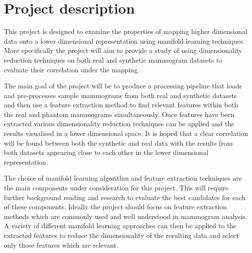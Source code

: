 \documentclass[11pt,fleqn,twoside]{article}
\begin{document}
\wordcount{}

\mmp

\setcounter{tocdepth}{3} %


\section{Project description}
This project is designed to examine the properties of mapping higher dimensional data onto a lower dimensional representation using manifold learning techniques. More specifically the project will aim to provide a study of using dimensionality reduction techniques on both real \cite{suckling1994mammographic} and synthetic\cite{bakic2002mammogram1, bakic2002mammogram2, bakic2003mammogram3} mammogram datasets to evaluate their correlation under the mapping.

The main goal of the project will be to produce a processing pipeline that loads and pre-processes sample mammograms from both real and synthetic datasets and then use a feature extraction method to find relevant features within both the real and phantom mammograms simultaneously. Once features have been extracted various dimensionality reduction techniques can be applied and the results visualised in a lower dimensional space. It is hoped that a clear correlation will be found between both the synthetic and real data with the results from both datasets appearing close to each other in the lower dimensional representation.

The choice of manifold learning algorithm and feature extraction techniques are the main components under consideration for this project. This will require further background reading and research to evaluate the best candidates for each of these components. Ideally the project should focus on feature extraction methods which are commonly used and well understood in mammogram analysis. A variety of different manifold learning approaches can then be applied to the extracted features to reduce the dimensionality of the resulting data and select only those features which are relevant.
\end{document}
